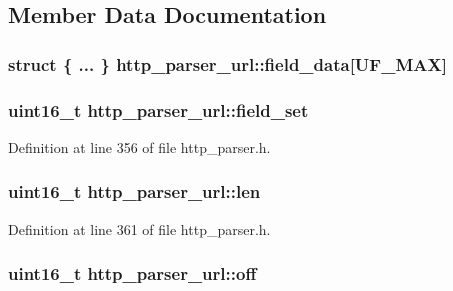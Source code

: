 \subsection{Member Data Documentation}
\hypertarget{structhttp__parser__url_a96a1fed71f3471692e9832f91b42f7db}{
\subsubsection[{field\-\_\-data}]{\setlength{\rightskip}{0pt plus 5cm}struct \{ ... \}   http\-\_\-parser\-\_\-url\-::field\-\_\-data\mbox{[}{\bf U\-F\-\_\-\-M\-A\-X}\mbox{]}}}\label{structhttp__parser__url_a96a1fed71f3471692e9832f91b42f7db}
\hypertarget{structhttp__parser__url_a77af61a480f11c41938810dd76ca49eb}{
\subsubsection[{field\-\_\-set}]{\setlength{\rightskip}{0pt plus 5cm}uint16\-\_\-t http\-\_\-parser\-\_\-url\-::field\-\_\-set}}\label{structhttp__parser__url_a77af61a480f11c41938810dd76ca49eb}


Definition at line 356 of file http\-\_\-parser.\-h.

\hypertarget{structhttp__parser__url_a60fb784a989dd5a95e5bd19d468d22c7}{
\subsubsection[{len}]{\setlength{\rightskip}{0pt plus 5cm}uint16\-\_\-t http\-\_\-parser\-\_\-url\-::len}}\label{structhttp__parser__url_a60fb784a989dd5a95e5bd19d468d22c7}


Definition at line 361 of file http\-\_\-parser.\-h.

\hypertarget{structhttp__parser__url_a6510826f3aa9a1100ac5f714323edeb1}{
\subsubsection[{off}]{\setlength{\rightskip}{0pt plus 5cm}uint16\-\_\-t http\-\_\-parser\-\_\-url\-::off}}\label{structhttp__parser__url_a6510826f3aa9a1100ac5f714323edeb1}


